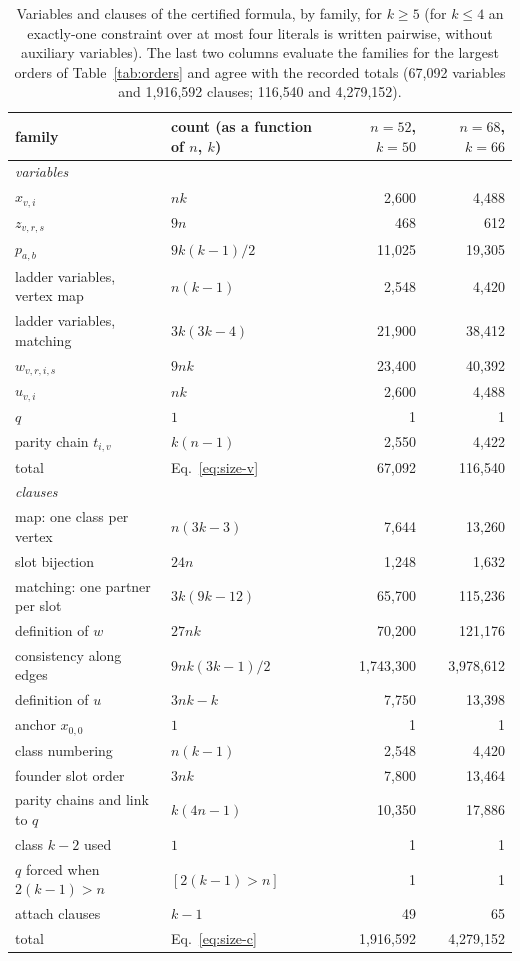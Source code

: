 \documentclass[11pt]{article}
\theoremstyle{definition}
\theoremstyle{remark}
\begin{document}
\begin{table}[tbp]\centering\small
\begin{tabular}{llrr}
\toprule
family & count (as a function of $n$, $k$) & $n=52$, $k=50$ & $n=68$, $k=66$\\
\midrule
\multicolumn{4}{l}{\textit{variables}} \\
$x_{v,i}$ & $nk$ & 2{,}600 & 4{,}488 \\
$z_{v,r,s}$ & $9n$ & 468 & 612 \\
$p_{a,b}$ & $9k(k-1)/2$ & 11{,}025 & 19{,}305 \\
ladder variables, vertex map & $n(k-1)$ & 2{,}548 & 4{,}420 \\
ladder variables, matching & $3k(3k-4)$ & 21{,}900 & 38{,}412 \\
$w_{v,r,i,s}$ & $9nk$ & 23{,}400 & 40{,}392 \\
$u_{v,i}$ & $nk$ & 2{,}600 & 4{,}488 \\
$q$ & $1$ & 1 & 1 \\
parity chain $t_{i,v}$ & $k(n-1)$ & 2{,}550 & 4{,}422 \\
\midrule
total & Eq.~\eqref{eq:size-v} & 67{,}092 & 116{,}540 \\
\midrule
\multicolumn{4}{l}{\textit{clauses}} \\
map: one class per vertex & $n(3k-3)$ & 7{,}644 & 13{,}260 \\
slot bijection & $24n$ & 1{,}248 & 1{,}632 \\
matching: one partner per slot & $3k(9k-12)$ & 65{,}700 & 115{,}236 \\
definition of $w$ & $27nk$ & 70{,}200 & 121{,}176 \\
consistency along edges & $9nk(3k-1)/2$ & 1{,}743{,}300 & 3{,}978{,}612 \\
definition of $u$ & $3nk-k$ & 7{,}750 & 13{,}398 \\
anchor $x_{0,0}$ & $1$ & 1 & 1 \\
class numbering & $n(k-1)$ & 2{,}548 & 4{,}420 \\
founder slot order & $3nk$ & 7{,}800 & 13{,}464 \\
parity chains and link to $q$ & $k(4n-1)$ & 10{,}350 & 17{,}886 \\
class $k-2$ used & $1$ & 1 & 1 \\
$q$ forced when $2(k-1)>n$ & $[2(k-1)>n]$ & 1 & 1 \\
attach clauses & $k-1$ & 49 & 65 \\
\midrule
total & Eq.~\eqref{eq:size-c} & 1{,}916{,}592 & 4{,}279{,}152 \\
\bottomrule
\end{tabular}
\caption{Variables and clauses of the certified formula, by family, for $k \ge 5$ (for $k \le 4$ an exactly-one constraint over at most four literals is written pairwise, without auxiliary variables). The last two columns evaluate the families for the largest orders of Table~\ref{tab:orders} and agree with the recorded totals (67{,}092 variables and 1{,}916{,}592 clauses; 116{,}540 and 4{,}279{,}152).}\label{tab:counts}
\end{table}
\end{document}
